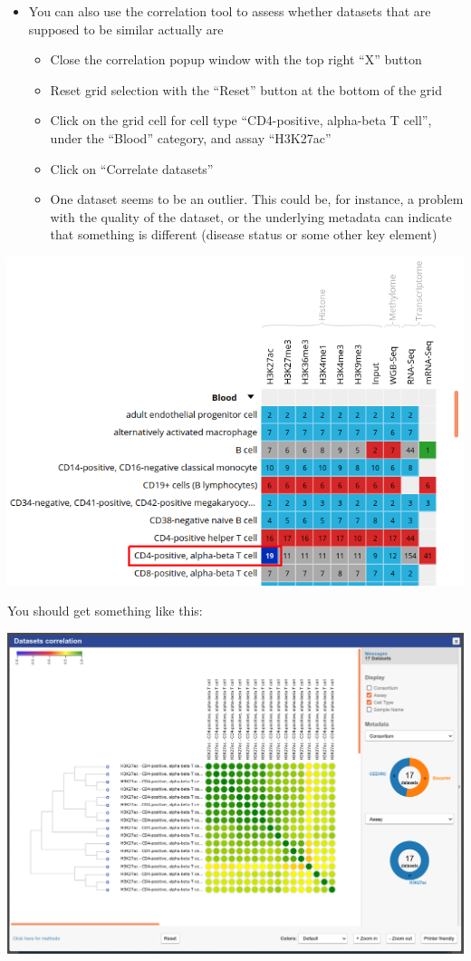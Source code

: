 \documentclass[
]{book}
\providecommand{\tightlist}{%
  \setlength{\itemsep}{0pt}\setlength{\parskip}{0pt}}
\begin{document}
\begin{itemize}
\tightlist
\item
  You can also use the correlation tool to assess whether datasets that are supposed to be similar actually are

  \begin{itemize}
  \tightlist
  \item
    Close the correlation popup window with the top right ``X'' button
  \item
    Reset grid selection with the ``Reset'' button at the bottom of the grid
  \item
    Click on the grid cell for cell type ``CD4-positive, alpha-beta T cell'', under the ``Blood'' category, and assay ``H3K27ac''
  \item
    Click on ``Correlate datasets''
  \item
    One dataset seems to be an outlier. This could be, for instance, a problem with the quality of the dataset, or the underlying metadata can indicate that something is different (disease status or some other key element)
  \end{itemize}
\end{itemize}

\includegraphics{./img/portal_selectTcell.png}

You should get something like this:

\includegraphics{./img/portal_correlationOutlier.png}
\end{document}
